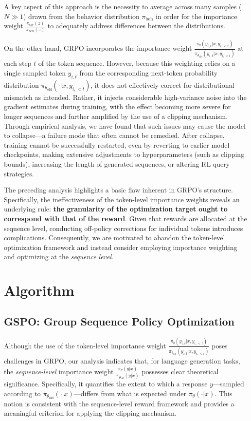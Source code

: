 A key aspect of this approach is the necessity to average across many samples ($N \gg 1$) drawn from the behavior distribution $\pi_\text{beh}$ in order for the importance weight $\frac{ \pi_\text{tar} (z) }{ \pi_\text{beh} (z)}$ to adequately address differences between the distributions.

On the other hand, GRPO incorporates the importance weight $\frac{ \pi_{\theta} (y_{i,t} | x, y_{i,<t}) }{ \pi_{\theta_\text{old}} (y_{i,t} | x,y_{i,<t})}$ at each step $t$ of the token sequence. However, because this weighting relies on a single sampled token $y_{i,t}$ from the corresponding next-token probability distribution $\pi_{\theta_\text{old}}( \cdot | x, y_{i, <t})$, it does not effectively correct for distributional mismatch as intended. Rather, it injects considerable high-variance noise into the gradient estimates during training, with the effect becoming more severe for longer sequences and further amplified by the use of a clipping mechanism. Through empirical analysis, we have found that such issues may cause the model to collapse—a failure mode that often cannot be remedied. After collapse, training cannot be successfully restarted, even by reverting to earlier model checkpoints, making extensive adjustments to hyperparameters (such as clipping bounds), increasing the length of generated sequences, or altering RL query strategies.

The preceding analysis highlights a basic flaw inherent in GRPO's structure. Specifically, the ineffectiveness of the token-level importance weights reveals an underlying rule: \textbf{the granularity of the optimization target ought to correspond with that of the reward}. Given that rewards are allocated at the sequence level, conducting off-policy corrections for individual tokens introduces complications. Consequently, we are motivated to abandon the token-level optimization framework and instead consider employing importance weighting and optimizing at the \textit{sequence level}.

\section{Algorithm}

\subsection{GSPO: Group Sequence Policy Optimization}

Although the use of the token-level importance weight $\frac{ \pi_{\theta} (y_{i,t} | x, y_{i,<t}) }{ \pi_{\theta_\text{old}} (y_{i,t} | x,y_{i,<t})}$ poses challenges in GRPO, our analysis indicates that, for language generation tasks, the \textit{sequence-level} importance weight $\frac{ \pi_{\theta} (y | x) }{ \pi_{\theta_\text{old}} (y | x)}$ possesses clear theoretical significance. Specifically, it quantifies the extent to which a response $y$—sampled according to $\pi_{\theta_\text{old}} (\cdot | x)$—differs from what is expected under $\pi_{\theta} (\cdot | x)$. This notion is consistent with the sequence-level reward framework and provides a meaningful criterion for applying the clipping mechanism.

